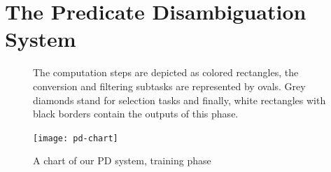 \documentclass[12pt,notitlepage]{report}
\begin{document}
\section{The Predicate Disambiguation System}\label{pd-overview}

\begin{figure}[p]
\caption{A chart of our PD system, training phase}\label{fig:pd-schema}
\noindent\footnotesize The computation steps are depicted as colored rectangles, the conversion and filtering subtasks are represented by ovals. Grey diamonds stand for selection tasks and finally, white rectangles with black borders contain the outputs of this phase.
\begin{center}
\texttt{[image: pd-chart]}
\end{center}
\end{figure}
\end{document}
